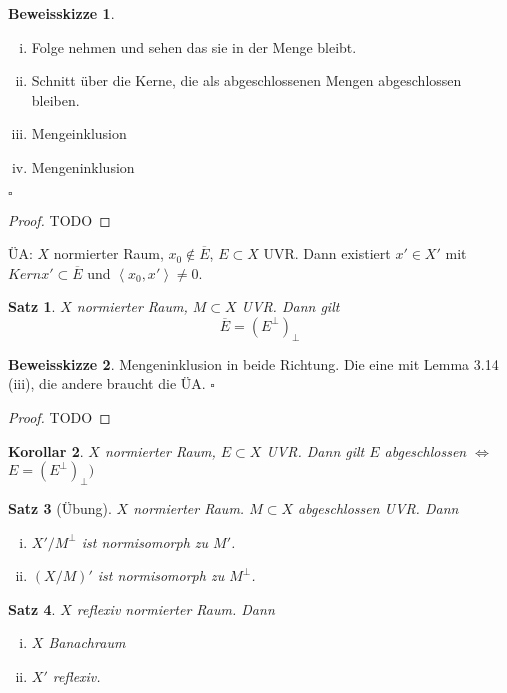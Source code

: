 \documentclass[ngerman]{report}
\theoremstyle{plain}%
\newtheorem{thm}{Satz}[chapter]
\newtheorem{cor}[thm]{Korollar}
\theoremstyle{definition}%
\theoremstyle{myStyle}
\newtheorem*{proof*}{Beweisskizze}
\newenvironment{hinweise}{\footnotesize \begin{proof*}}{\hfill $\square$ \end{proof*}\normalsize}
\newcommand{\aq}{\Leftrightarrow} %
\newcommand{\fop}[1]{\left \langle #1 \right \rangle} %
\begin{document}
	\begin{hinweise}
			\begin{enumerate}[(i)]
				\item Folge nehmen und sehen das sie in der Menge bleibt.
				\item Schnitt über die Kerne, die als abgeschlossenen Mengen abgeschlossen bleiben.
				\item Mengeinklusion
				\item Mengeninklusion
			\end{enumerate}
	\end{hinweise}

	\begin{proof}
		TODO
	\end{proof}

	ÜA: $X$ normierter Raum, $x_0 \not\in \overline{E}$, $E\subset X$ UVR. Dann existiert $x' \in X'$ mit  $Kern x' \subset \overline{E}$ und $\fop{x_0, x'} \neq 0.$

	\begin{thm} $X$ normierter Raum, $M \subset X$ UVR. Dann gilt 
		$$\overline{E} = (E^\perp)_\perp $$
	\end{thm}

	\begin{hinweise}
		Mengeninklusion in beide Richtung. Die eine mit Lemma 3.14 (iii), die andere braucht die ÜA. 
	\end{hinweise}

	\begin{proof}
		TODO
	\end{proof}

	\begin{cor} 
		$X$ normierter Raum, $E\subset X$ UVR. Dann gilt $E$ abgeschlossen $\aq$	$ E = (E^\perp)_\perp)$
	\end{cor}

	\begin{thm}[Übung]
		$X$ normierter Raum. $M \subset X$ abgeschlossen UVR. Dann 
					\begin{enumerate}[(i)]
						\item $X' / M^\perp$ ist normisomorph zu $M'$.
						\item $(X / M)'$ ist normisomorph zu $M^\perp$.
					\end{enumerate}
	\end{thm}

	\begin{thm}
		$X$ reflexiv normierter Raum. Dann
					\begin{enumerate}[(i)]
						\item $X$ Banachraum
						\item $X'$ reflexiv.
					\end{enumerate}

	\end{thm}
\end{document}
